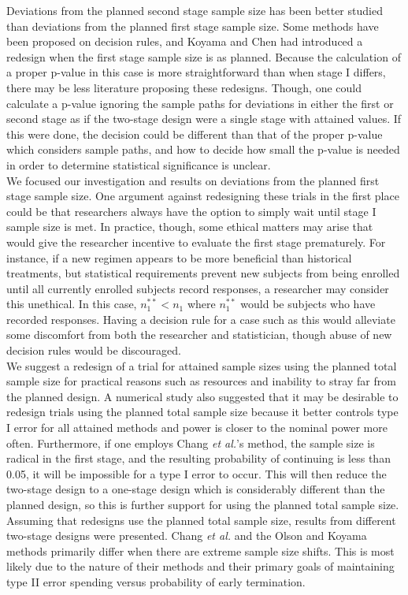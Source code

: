 \documentclass[12pt]{report}\usepackage[]{graphicx}\usepackage[]{color}
\newlength{\li}\setlength{\li}{14.48pt}
\newlength{\di}\setlength{\di}{-3.5mm}
\begin{document}
Deviations from the planned second stage sample size has been better studied than deviations from the planned first stage sample size. Some methods have been proposed on decision rules, and Koyama and Chen had introduced a redesign when the first stage sample size is as planned. Because the calculation of a proper p-value in this case is more straightforward than when stage I differs, there may be less literature proposing these redesigns. Though, one could calculate a p-value ignoring the sample paths for deviations in either the first or second stage as if the two-stage design were a single stage with attained values. If this were done, the decision could be different than that of the proper p-value which considers sample paths, and how to decide how small the p-value is needed in order to determine statistical significance is unclear.\\
\indent We focused our investigation and results on deviations from the planned first stage sample size. One argument against redesigning these trials in the first place could be that researchers always have the option to simply wait until stage I sample size is met. In practice, though, some ethical matters may arise that would give the researcher incentive to evaluate the first stage prematurely. For instance, if a new regimen appears to be more beneficial than historical treatments, but statistical requirements prevent new subjects from being enrolled until all currently enrolled subjects record responses, a researcher may consider this unethical. In this case, $n_1^{\ast\ast} < n_1$ where $n_1^{\ast\ast}$ would be subjects who have recorded responses. Having a decision rule for a case such as this would alleviate some discomfort from both the researcher and statistician, though abuse of new decision rules would be discouraged. \\
\indent We suggest a redesign of a trial for attained sample sizes using the planned total sample size for practical reasons such as resources and inability to stray far from the planned design. A numerical study also suggested that it may be desirable to redesign trials using the planned total sample size because it better controls type I error for all attained methods and power is closer to the nominal power more often. Furthermore, if one employs Chang \textit{et al.}'s method, the sample size is radical in the first stage, and the resulting probability of continuing is less than 0.05, it will be impossible for a type I error to occur. This will then reduce the two-stage design to a one-stage design which is considerably different than the planned design, so this is further support for using the planned total sample size.  Assuming that redesigns use the planned total sample size, results from different two-stage designs were presented.  Chang \textit{et al.} and the Olson and Koyama methods primarily differ when there are extreme sample size shifts. This is most likely due to the nature of their methods and their primary goals of maintaining type II error spending versus probability of early termination. \\
\end{document}
